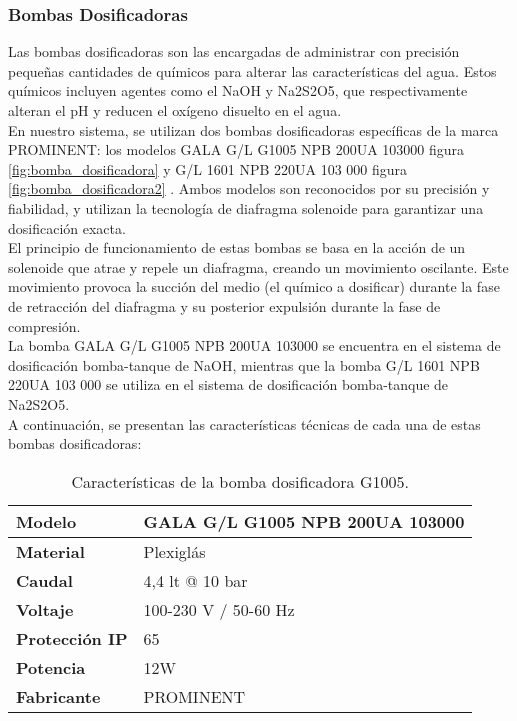 \subsubsection{Bombas Dosificadoras}

Las bombas dosificadoras son las encargadas de administrar con precisión pequeñas 
 cantidades de químicos para alterar las características del agua. Estos químicos incluyen 
 agentes como el NaOH y Na2S2O5, que respectivamente alteran el pH y reducen el oxígeno disuelto en el agua.\\

En nuestro sistema, se utilizan dos bombas dosificadoras específicas de la marca PROMINENT: 
los modelos GALA G/L G1005 NPB 200UA 103000 figura \ref{fig:bomba_dosificadora} y G/L 1601 NPB 220UA 103 000 figura \ref{fig:bomba_dosificadora2} . Ambos modelos 
son reconocidos por su precisión y fiabilidad, y utilizan la tecnología de diafragma 
solenoide para garantizar una dosificación exacta.\\

El principio de funcionamiento de estas bombas se basa en la acción de un solenoide que atrae y repele un diafragma, creando un movimiento oscilante. Este movimiento provoca la succión del medio (el químico a dosificar) durante la fase de retracción del diafragma y su posterior expulsión durante la fase de compresión.\\

La bomba GALA G/L G1005 NPB 200UA 103000 se encuentra en el sistema de dosificación bomba-tanque de NaOH, mientras que la bomba G/L 1601 NPB 220UA 103 000 se utiliza en el sistema de dosificación bomba-tanque de Na2S2O5.\\

A continuación, se presentan las características técnicas de cada una de estas bombas dosificadoras:\\



\begin{table}[H]
    \centering
    \caption{Características de la bomba dosificadora G1005.}
    \label{table:bomba_dosificadora}
    \begin{tabular}{| L{6cm} | L{6cm} |}
        \hline
        \textbf{Modelo} & GALA G/L G1005 NPB 200UA 103000  \\
        \hline
        \textbf{Material} & Plexiglás \\
        \hline
        \textbf{Caudal} & 4,4 lt @ 10 bar \\
        \hline
        \textbf{Voltaje} & 100-230 V / 50-60 Hz \\
        \hline
        \textbf{Protección IP} & 65 \\
        \hline
        \textbf{Potencia} & 12W \\
        \hline
        \textbf{Fabricante} & PROMINENT \\
        \hline
    \end{tabular}
\end{table}

